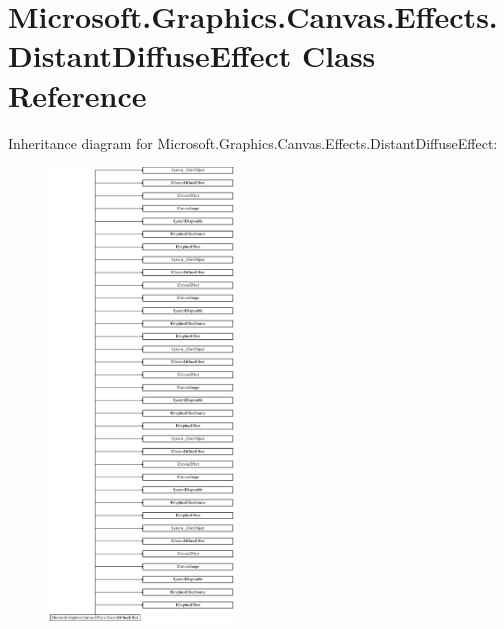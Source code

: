 \hypertarget{class_microsoft_1_1_graphics_1_1_canvas_1_1_effects_1_1_distant_diffuse_effect}{}\section{Microsoft.\+Graphics.\+Canvas.\+Effects.\+Distant\+Diffuse\+Effect Class Reference}
\label{class_microsoft_1_1_graphics_1_1_canvas_1_1_effects_1_1_distant_diffuse_effect}
Inheritance diagram for Microsoft.\+Graphics.\+Canvas.\+Effects.\+Distant\+Diffuse\+Effect\+:\begin{figure}[H]
\begin{center}
\leavevmode
\includegraphics[height=12.000000cm]{class_microsoft_1_1_graphics_1_1_canvas_1_1_effects_1_1_distant_diffuse_effect}
\end{center}
\end{figure}
